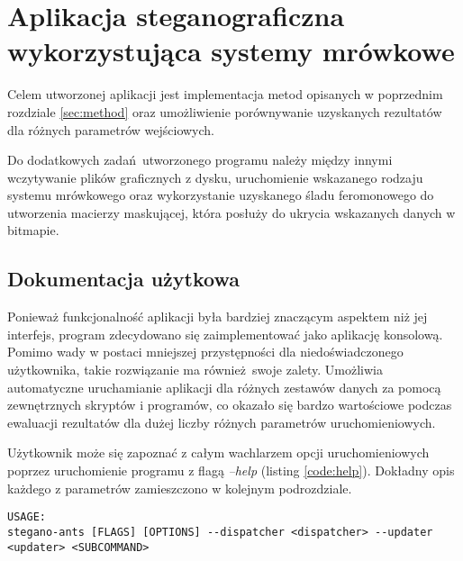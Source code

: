\chapter{Aplikacja steganograficzna wykorzystująca systemy mrówkowe}\label{chap:implementation}
{
    Celem utworzonej aplikacji jest implementacja metod opisanych w poprzednim rozdziale \ref{sec:method} oraz
    umożliwienie porównywanie uzyskanych rezultatów dla różnych parametrów wejściowych.

    Do dodatkowych zadań utworzonego programu należy między innymi wczytywanie plików graficznych z dysku, uruchomienie
    wskazanego rodzaju systemu mrówkowego oraz wykorzystanie uzyskanego śladu feromonowego do utworzenia macierzy
    maskującej, która posłuży do ukrycia wskazanych danych w bitmapie.

    \section{Dokumentacja użytkowa}
    {
        Ponieważ funkcjonalność aplikacji była bardziej znaczącym aspektem niż jej interfejs, program zdecydowano się
        zaimplementować jako aplikację konsolową. Pomimo wady w postaci mniejszej przystępności dla niedoświadczonego
        użytkownika, takie rozwiązanie ma również swoje zalety. Umożliwia automatyczne uruchamianie aplikacji dla
        różnych zestawów danych za pomocą zewnętrznych skryptów i programów, co okazało się bardzo wartościowe podczas
        ewaluacji rezultatów dla dużej liczby różnych parametrów uruchomieniowych.

        Użytkownik może się zapoznać z całym wachlarzem opcji uruchomieniowych poprzez uruchomienie
        programu z flagą \textit{--help} (listing \ref{code:help}). Dokładny opis każdego z parametrów zamieszczono w
        kolejnym podrozdziale.

        \begin{lstlisting}[basicstyle=\tiny, caption=Pomoc programu, label=code:help]
USAGE:
stegano-ants [FLAGS] [OPTIONS] --dispatcher <dispatcher> --updater <updater> <SUBCOMMAND>


\end{lstlisting}}}
